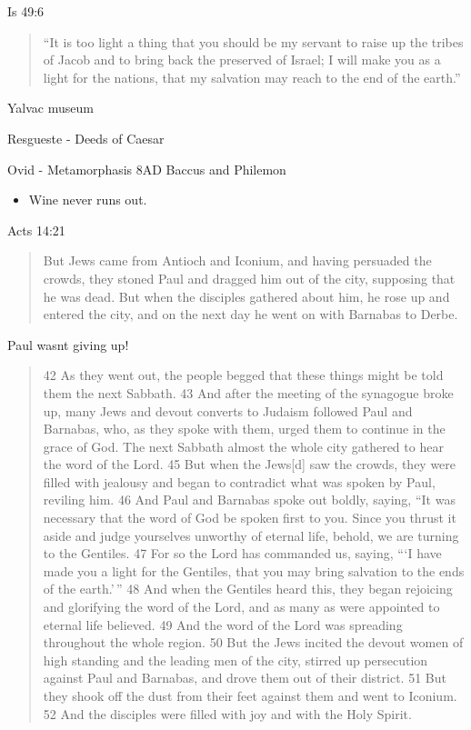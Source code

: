 \documentclass[
]{book}
\providecommand{\tightlist}{%
  \setlength{\itemsep}{0pt}\setlength{\parskip}{0pt}}
\begin{document}
Is 49:6

\begin{quote}
``It is too light a thing that you should be my servant
to raise up the tribes of Jacob
and to bring back the preserved of Israel;
I will make you as a light for the nations,
that my salvation may reach to the end of the earth.''
\end{quote}

Yalvac museum

Resgueste - Deeds of Caesar

Ovid - Metamorphasis 8AD Baccus and Philemon

\begin{itemize}
\tightlist
\item
  Wine never runs out.
\end{itemize}

Acts 14:21

\begin{quote}
But Jews came from Antioch and Iconium, and having persuaded the crowds, they stoned Paul and dragged him out of the city, supposing that he was dead. But when the disciples gathered about him, he rose up and entered the city, and on the next day he went on with Barnabas to Derbe.
\end{quote}

Paul wasnt giving up!

\begin{quote}
42 As they went out, the people begged that these things might be told them the next Sabbath. 43 And after the meeting of the synagogue broke up, many Jews and devout converts to Judaism followed Paul and Barnabas, who, as they spoke with them, urged them to continue in the grace of God. The next Sabbath almost the whole city gathered to hear the word of the Lord. 45 But when the Jews{[}d{]} saw the crowds, they were filled with jealousy and began to contradict what was spoken by Paul, reviling him. 46 And Paul and Barnabas spoke out boldly, saying, ``It was necessary that the word of God be spoken first to you. Since you thrust it aside and judge yourselves unworthy of eternal life, behold, we are turning to the Gentiles. 47 For so the Lord has commanded us, saying,
```I have made you a light for the Gentiles,
that you may bring salvation to the ends of the earth.'\,''
48 And when the Gentiles heard this, they began rejoicing and glorifying the word of the Lord, and as many as were appointed to eternal life believed. 49 And the word of the Lord was spreading throughout the whole region. 50 But the Jews incited the devout women of high standing and the leading men of the city, stirred up persecution against Paul and Barnabas, and drove them out of their district. 51 But they shook off the dust from their feet against them and went to Iconium. 52 And the disciples were filled with joy and with the Holy Spirit.
\end{quote}
\end{document}
